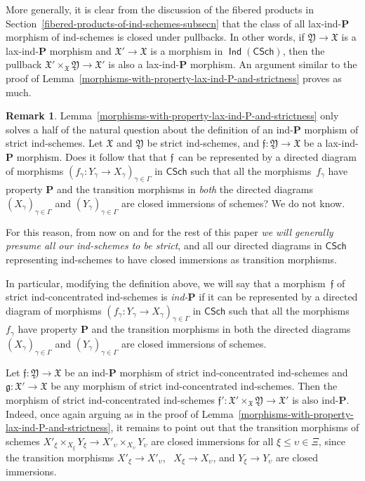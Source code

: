 \documentclass[12pt,a4paper]{amsart}
\newcommand{\+}{\protect\nobreakdash-}
\renewcommand{\:}{\colon}
\newcommand{\rarrow}{\longrightarrow}
\DeclareMathOperator{\Ind}{\mathsf{Ind}}
\newcommand{\CSch}{\mathsf{CSch}}
\newcommand{\bP}{\mathbf P}
\newcommand{\fX}{\mathfrak X}
\newcommand{\fY}{\mathfrak Y}
\newcommand{\ff}{\mathfrak f}
\newcommand{\fg}{\mathfrak g}
\theoremstyle{plain}
\theoremstyle{definition}
\newtheorem{rem}[thm]{Remark}
\begin{document}
 More generally, it is clear from the discussion of the fibered
products in Section~\ref{fibered-products-of-ind-schemes-subsecn}
that the class of all lax-ind\+$\bP$ morphism of ind-schemes is
closed under pullbacks.
 In other words, if $\fY\rarrow\fX$ is a lax-ind\+$\bP$ morphism and
$\fX'\rarrow\fX$ is a morphism in $\Ind(\CSch)$, then the pullback
$\fX'\times_\fX\fY\rarrow\fX'$ is also a lax-ind\+$\bP$ morphism.
 An argument similar to the proof of
Lemma~\ref{morphisms-with-property-lax-ind-P-and-strictness}
proves as much.

\begin{rem} \label{ind-P-morphisms-of-strict-ind-schemes-remark}
 Lemma~\ref{morphisms-with-property-lax-ind-P-and-strictness} only
solves a half of the natural question about the definition of
an ind\+$\bP$ morphism of strict ind-schemes.
 Let $\fX$ and $\fY$ be strict ind-schemes, and $\ff\:\fY\rarrow\fX$
be a lax-ind\+$\bP$ morphism.
 Does it follow that that $\ff$~can be represented by a directed diagram
of morphisms $(f_\gamma\:Y_\gamma\to X_\gamma)_{\gamma\in\Gamma}$ in
$\CSch$ such that all the morphisms~$f_\gamma$ have property $\bP$ and
the transition morphisms in \emph{both} the directed diagrams
$(X_\gamma)_{\gamma\in\Gamma}$ and $(Y_\gamma)_{\gamma\in\Gamma}$ are
closed immersions of schemes?
 We do not know.

 For this reason, from now on and for the rest of this paper
\emph{we will generally presume all our ind-schemes to be strict}, and
all our directed diagrams in $\CSch$ representing ind-schemes to have
closed immersions as transition morphisms.

 In particular, modifying the definition above, we will say that
a morphism~$\ff$ of strict ind-concentrated ind-schemes is
\emph{ind\+$\bP$} if it can be represented by a directed diagram of
morphisms $(f_\gamma\:Y_\gamma\to X_\gamma)_{\gamma\in\Gamma}$ in
$\CSch$ such that all the morphisms~$f_\gamma$ have property $\bP$ and
the transition morphisms in both the directed diagrams
$(X_\gamma)_{\gamma\in\Gamma}$ and $(Y_\gamma)_{\gamma\in\Gamma}$
are closed immersions of schemes.
\end{rem}

 Let $\ff\:\fY\rarrow\fX$ be an ind\+$\bP$ morphism of strict
ind-concentrated ind-schemes and $\fg\:\fX'\rarrow\fX$ be any morphism
of strict ind-concentrated ind-schemes.
 Then the morphism of strict ind-concentrated ind-schemes
$\ff'\:\fX'\times_\fX\fY\rarrow\fX'$ is also ind\+$\bP$.
 Indeed, once again arguing as in the proof of
Lemma~\ref{morphisms-with-property-lax-ind-P-and-strictness},
it remains to point out that the transition morphisms of schemes
$X'_\xi\times_{X_\xi} Y_\xi\rarrow X'_\upsilon\times_{X_\upsilon}
Y_\upsilon$ are closed immersions for all $\xi\le\upsilon\in\Xi$,
since the transition morphisms $X'_\xi\rarrow X'_\upsilon$, \
$X_\xi\rarrow X_\upsilon$, and $Y_\xi\rarrow Y_\upsilon$ are closed
immersions.
\end{document}
